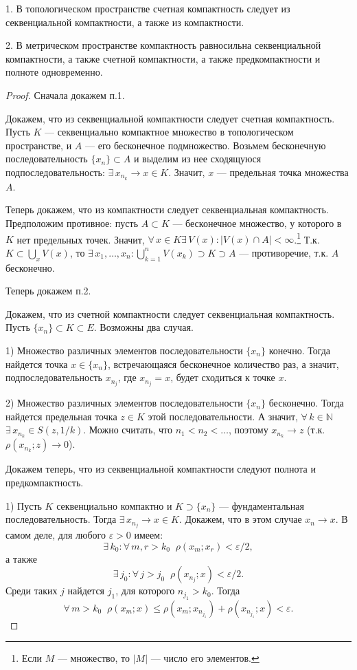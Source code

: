 \documentclass[10pt]{article}
\begin{document}
\begin{theorem}
1. В топологическом пространстве счетная компактность следует из
секвенциальной компактности, а также из компактности.

2. В метрическом пространстве компактность равносильна
секвенциальной компактности, а также счетной компактности, а также
предкомпактности и полноте одновременно.
\end{theorem}

\begin{proof}
Сначала докажем п.1.

Докажем, что из секвенциальной компактности следует счетная
компактность. Пусть $K$ --- секвенциально компактное множество в
топологическом пространстве, и $A$ --- его бесконечное подмножество.
Возьмем бесконечную последовательность $\{x_n\}\subset A$ и выделим
из нее сходящуюся подпоследовательность: $\exists\, x_{n_k}\to x\in
K$. Значит, $x$ --- предельная точка множества $A$.

Теперь докажем, что из компактности следует секвенциальная
компактность. Предположим противное: пусть $A\subset K$ ---
бесконечное множество, у которого в $K$ нет предельных точек.
Значит, $\forall\,x\in K$\;\;$\exists\,V(x):|V(x)\cap
A|<\infty$.\footnote{Если $M$ --- множество, то $|M|$ --- число его
элементов.} Т.к. $K\subset \bigcup\limits_x V(x)$, то
$\exists\,x_1,\ldots,x_n:\bigcup\limits_{k=1}^nV(x_k)\supset
K\supset A$ --- противоречие, т.к. $A$ бесконечно.

Теперь докажем п.2.

 Докажем, что из счетной компактности следует
секвенциальная компактность. Пусть $\{x_n\}\subset K\subset E$.
Возможны два случая.

1) Множество различных элементов последовательности $\{x_n\}$
конечно. Тогда найдется точка $x\in\{x_n\}$, встречающаяся
бесконечное количество раз, а значит, подпоследовательность
${x_{n_j}}$, где $x_{n_j}=x$, будет сходиться к точке $x$.

2) Множество различных элементов последовательности $\{x_n\}$
бесконечно. Тогда найдется предельная точка $z\in K$ этой
последовательности. А значит,
$\forall\,k\in\mathbb{N}$\;\;$\exists\,x_{n_k}\in S(z,1/k)$. Можно
считать, что $n_1<n_2<\ldots$, поэтому $x_{n_k}\to z$ (т.к.
$\rho(x_{n_k};z)\to 0$).

Докажем теперь, что из секвенциальной компактности следуют полнота и
предкомпактность.

1) Пусть $K$ секвенциально компактно и $K\supset\{x_n\}$ ---
фундаментальная последовательность. Тогда $\exists\,x_{n_j}\to x\in
K$. Докажем, что в этом случае $x_n\to x$. В самом деле, для любого
$\varepsilon>0$ имеем:
$$\exists\,k_0:\forall\,m,r>k_0\;\;\rho(x_m;x_r)<\varepsilon/2,$$
а также
$$\exists\,j_0:\forall\,j>j_0\;\;\rho(x_{n_j};x)<\varepsilon/2.$$
Среди таких $j$ найдется $j_1$, для которого $n_{j_1}>k_0$. Тогда
$$\forall\,m>k_0\;\;\rho(x_m;x)\leqslant
\rho(x_m;x_{n_{j_1}})+\rho(x_{n_{j_1}};x)<\varepsilon.$$


\end{proof}
\end{document}
